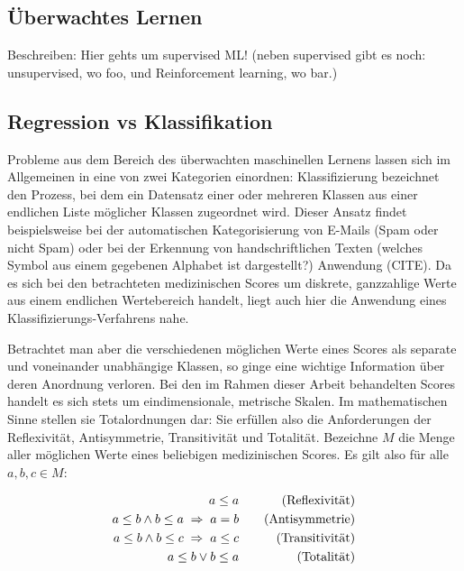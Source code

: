 \subsection{Überwachtes Lernen}\label{section:supervised_learning}
Beschreiben: Hier gehts um supervised ML! (neben supervised gibt es noch: unsupervised, wo foo, und Reinforcement learning, wo bar.)

\subsection{Regression vs Klassifikation}\label{section:regrvsclf}
Probleme aus dem Bereich des überwachten maschinellen Lernens lassen sich im Allgemeinen in eine von zwei Kategorien einordnen:
Klassifizierung bezeichnet den Prozess, bei dem ein Datensatz einer oder mehreren Klassen aus einer endlichen Liste möglicher Klassen zugeordnet wird. Dieser Ansatz findet beispielsweise bei der automatischen Kategorisierung von E-Mails (Spam oder nicht Spam) oder bei der Erkennung von handschriftlichen Texten (welches Symbol aus einem gegebenen Alphabet ist dargestellt?) Anwendung (CITE). 
Da es sich bei den betrachteten medizinischen Scores um diskrete, ganzzahlige Werte aus einem endlichen Wertebereich handelt, liegt auch hier die Anwendung eines Klassifizierungs-Verfahrens nahe.

Betrachtet man aber die verschiedenen möglichen Werte eines Scores als separate und voneinander unabhängige Klassen, so ginge eine wichtige Information über deren Anordnung verloren. Bei den im Rahmen dieser Arbeit behandelten Scores handelt es sich stets um eindimensionale, metrische Skalen. Im mathematischen Sinne stellen sie Totalordnungen dar: Sie erfüllen also die Anforderungen der Reflexivität, Antisymmetrie, Transitivität und Totalität. Bezeichne $M$ die Menge aller möglichen Werte eines beliebigen medizinischen Scores. Es gilt also für alle $a,b,c \in M$:

\begin{equation*}
    \centering
    \begin{aligned}[c]
        a \leq a\\
        a \leq b \land b \leq a \; \Rightarrow \; a=b\\
        a \leq b \land b \leq c \; \Rightarrow \; a \leq c\\
        a \leq b \lor b \leq a
    \end{aligned}
    \qquad
    \begin{aligned}[c]
        \text{(Reflexivität)}\\
        \text{(Antisymmetrie)}\\
        \text{(Transitivität)}\\
        \text{(Totalität)}
    \end{aligned}
\end{equation*}

